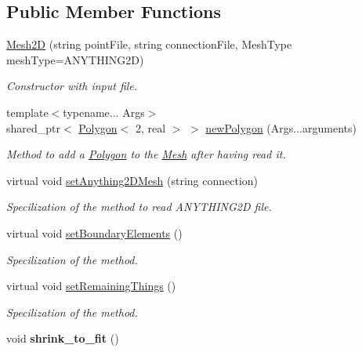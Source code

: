 \subsection*{Public Member Functions}
\begin{DoxyCompactItemize}
\item 
\hyperlink{class_mesh2_d_a98d286dea8fdf7b908b3a56991beca47}{Mesh2D} (string point\+File, string connection\+File, Mesh\+Type mesh\+Type=A\+N\+Y\+T\+H\+I\+N\+G2D)\hypertarget{class_mesh2_d_a98d286dea8fdf7b908b3a56991beca47}{}\label{class_mesh2_d_a98d286dea8fdf7b908b3a56991beca47}

\begin{DoxyCompactList}\small\item\em Constructor with input file. \end{DoxyCompactList}\item 
{\footnotesize template$<$typename... Args$>$ }\\shared\+\_\+ptr$<$ \hyperlink{class_polygon}{Polygon}$<$ 2, real $>$ $>$ \hyperlink{class_mesh2_d_a08651a8b7f996ea4d8896bd0802d6f24}{new\+Polygon} (Args...\+arguments)\hypertarget{class_mesh2_d_a08651a8b7f996ea4d8896bd0802d6f24}{}\label{class_mesh2_d_a08651a8b7f996ea4d8896bd0802d6f24}

\begin{DoxyCompactList}\small\item\em Method to add a \hyperlink{class_polygon}{Polygon} to the \hyperlink{class_mesh}{Mesh} after having read it. \end{DoxyCompactList}\item 
virtual void \hyperlink{class_mesh2_d_a6cf7a73abadd08ecd18d6f35c7b644c3}{set\+Anything2\+D\+Mesh} (string connection)\hypertarget{class_mesh2_d_a6cf7a73abadd08ecd18d6f35c7b644c3}{}\label{class_mesh2_d_a6cf7a73abadd08ecd18d6f35c7b644c3}

\begin{DoxyCompactList}\small\item\em Specilization of the method to read A\+N\+Y\+T\+H\+I\+N\+G2D file. \end{DoxyCompactList}\item 
virtual void \hyperlink{class_mesh2_d_ac6408b5999b1deddbbd137dc8bd9e1cd}{set\+Boundary\+Elements} ()
\begin{DoxyCompactList}\small\item\em Specilization of the method. \end{DoxyCompactList}\item 
virtual void \hyperlink{class_mesh2_d_ae52c22a91d85fdb99955bf57162f6dac}{set\+Remaining\+Things} ()
\begin{DoxyCompactList}\small\item\em Specilization of the method. \end{DoxyCompactList}\item 
void {\bfseries shrink\+\_\+to\+\_\+fit} ()\hypertarget{class_mesh2_d_a06fba3c3fc41d127a8238d4a1b7972a3}{}\label{class_mesh2_d_a06fba3c3fc41d127a8238d4a1b7972a3}

\end{DoxyCompactItemize}
